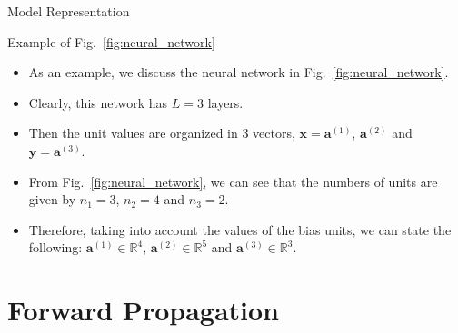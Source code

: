 \documentclass[8pt,american]{beamer}
\begin{document}
\begin{frame}{Model Representation}

\begin{block}{Example of Fig.~\ref{fig:neural_network}}
\begin{itemize}
\justifying
\item As an example, we discuss the neural network in
  Fig.~\ref{fig:neural_network}.
\item Clearly, this network has $L=3$ layers.
\item Then the unit values are organized in 3 vectors,
  $\mathbf{x}=\mathbf{a}^{\left(1\right)}$, $\mathbf{a}^{\left(2\right)}$ and
  $\mathbf{y}=\mathbf{a}^{\left(3\right)}$.
\item From Fig.~\ref{fig:neural_network}, we can see that the numbers of units
  are given by $n_{1}=3$, $n_{2}=4$ and $n_{3}=2$.
\item Therefore, taking into account the values of the bias units, we can state
  the following: $\mathbf{a}^{\left(1\right)}\in\mathbb{R}^{4}$,
  $\mathbf{a}^{\left(2\right)}\in\mathbb{R}^{5}$ and
  $\mathbf{a}^{\left(3\right)}\in\mathbb{R}^{3}$.
\end{itemize}
\end{block}

\end{frame}

\section[]{Forward Propagation}
\end{document}
